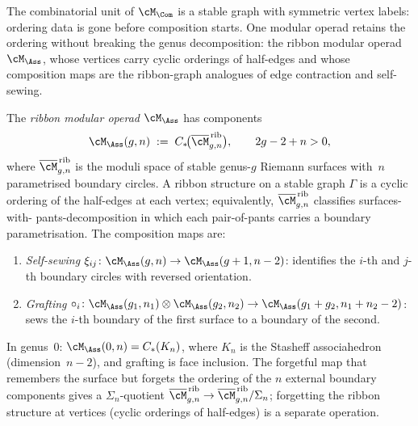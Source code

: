 The combinatorial unit of $\cM_{\Com}$ is a stable graph with
symmetric vertex labels: ordering data is gone before composition
starts. One modular operad retains the ordering without breaking
the genus decomposition: the ribbon modular operad $\cM_{\Ass}$,
whose vertices carry cyclic orderings of half-edges and whose
composition maps are the ribbon-graph analogues of edge contraction
and self-sewing.

\begin{definition}
\label{def:ribbon-modular-operad}
\ClaimStatusProvedElsewhere
{}
The \emph{ribbon modular operad}
$\cM_{\Ass}$ has components
\begin{equation}
\label{eq:ribbon-modular-operad}
\cM_{\Ass}(g,n)
\;:=\;
C_*\!\bigl(\overline{\cM}_{g,n}^{\,\mathrm{rib}}\bigr),
\qquad 2g - 2 + n > 0,
\end{equation}
where $\overline{\cM}_{g,n}^{\,\mathrm{rib}}$ is the moduli space
of stable genus-$g$ Riemann surfaces with~$n$ parametrised boundary
circles. A ribbon structure on a stable graph $\Gamma$ is a cyclic
ordering of the half-edges at each vertex; equivalently,
$\overline{\cM}_{g,n}^{\,\mathrm{rib}}$ classifies surfaces-with-%
pants-decomposition in which each pair-of-pants carries a boundary
parametrisation. The composition maps are:
\begin{enumerate}[label=\textup{(\roman*)}]
\item \emph{Self-sewing} $\xi_{ij}\colon
 \cM_\Ass(g,n) \to \cM_\Ass(g+1,n-2)$: identifies the
 $i$-th and $j$-th boundary circles with reversed orientation.
\item \emph{Grafting} $\circ_i\colon
 \cM_\Ass(g_1,n_1) \otimes \cM_\Ass(g_2,n_2)
 \to \cM_\Ass(g_1+g_2, n_1+n_2-2)$: sews the $i$-th
 boundary of the first surface to a boundary of the second.
\end{enumerate}
In genus~$0$: $\cM_{\Ass}(0,n) = C_*(K_n)$, where $K_n$ is the
Stasheff associahedron (dimension~$n-2$), and grafting is face
inclusion. The forgetful map that remembers the surface but forgets the
ordering of the $n$ external boundary components gives a
$\Sigma_n$-quotient
$\overline{\cM}_{g,n}^{\,\mathrm{rib}} \to
\overline{\cM}_{g,n}^{\,\mathrm{rib}}/\Sigma_n$;
forgetting the ribbon structure at vertices (cyclic orderings of
half-edges) is a separate operation.
\end{definition}

